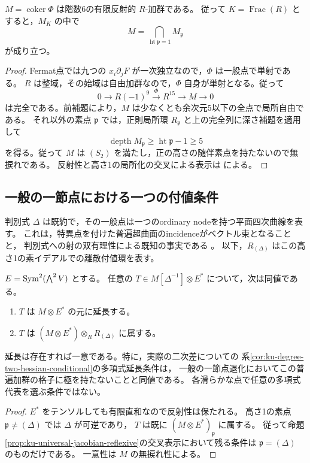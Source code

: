 \begin{proposition}[普遍四次Jacobian加群の反射性]
\label{prop:ku-universal-jacobian-reflexive}
$M=\operatorname{coker}\Phi$ は階数6の有限反射的 $R$-加群である。
従って $K=\operatorname{Frac}(R)$ とすると，$M_K$ の中で
\[
 M=\bigcap_{\operatorname{ht}\mathfrak p=1}M_{\mathfrak p}
\]
が成り立つ。
\end{proposition}
\begin{proof}
Fermat点では九つの $x_i\partial_jF$ が一次独立なので，$\Phi$ は一般点で単射である。
$R$ は整域，その始域は自由加群なので，$\Phi$ 自身が単射となる。従って
\[
 0\longrightarrow R(-1)^9\xrightarrow{\Phi}R^{15}
 \longrightarrow M\longrightarrow0
\]
は完全である。前補題により，$M$ は少なくとも余次元5以下の全点で局所自由である。
それ以外の素点 $\mathfrak p$ では，正則局所環 $R_{\mathfrak p}$ と上の完全列に深さ補題を適用して
\[
 \operatorname{depth}M_{\mathfrak p}
 \ge\operatorname{ht}\mathfrak p-1\ge5
\]
を得る。従って $M$ は $(S_2)$ を満たし，正の高さの随伴素点を持たないので無捩れである。
反射性と高さ1の局所化の交叉による表示は
\cite[Tag 0AVB]{StacksProject}による。
\end{proof}

\subsection{一般の一節点における一つの付値条件}

判別式 $\Delta$ は既約で，その一般点は一つのordinary nodeを持つ平面四次曲線を表す。
これは，特異点を付けた普遍超曲面のincidenceがベクトル束となることと，
判別式への射の双有理性による既知の事実である
\cite[\S2, Propositions 5.1--5.2]{PoonenStoll2025}。
以下，$R_{(\Delta)}$ はこの高さ1の素イデアルでの離散付値環を表す。

\begin{theorem}[一般一節点での延長判定]
\label{thm:ku-degree-two-nodal-extension-criterion}
$E=\operatorname{Sym}^2(\bigwedge^2V)$ とする。
任意の $T\in M[\Delta^{-1}]\otimes E^*$ について，次は同値である。
\begin{enumerate}
 \item $T$ は $M\otimes E^*$ の元に延長する。
 \item $T$ は $(M\otimes E^*)\otimes_R R_{(\Delta)}$ に属する。
\end{enumerate}
延長は存在すれば一意である。特に，実際の二次差についての
系\ref{cor:ku-degree-two-hessian-conditional}の多項式延長条件は，
一般の一節点退化においてこの普遍加群の格子に極を持たないことと同値である。
各滑らかな点で任意の多項式代表を選ぶ条件ではない。
\end{theorem}
\begin{proof}
$E^*$ をテンソルしても有限直和なので反射性は保たれる。
高さ1の素点 $\mathfrak p\ne(\Delta)$ では $\Delta$ が可逆であり，
$T$ は既に $(M\otimes E^*)_{\mathfrak p}$ に属する。
従って命題\ref{prop:ku-universal-jacobian-reflexive}の交叉表示において残る条件は
$\mathfrak p=(\Delta)$ のものだけである。
一意性は $M$ の無捩れ性による。
\end{proof}

